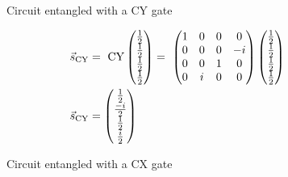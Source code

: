 
\begin{figure}[!h]
    \centering
    \caption{Circuit entangled with a $\mathrm{CY}$ gate}
    \label{fig:cy_entanglement}
\end{figure}


\begin{equation}
    \centering
    \begin{split}
        \vec{s}_{\mathrm{CY}} &=\ \mathrm{CY}\begin{pmatrix}
            \frac{1}{2}\\\frac{1}{2}\\\frac{1}{2}\\\frac{1}{2}
        \end{pmatrix} =\  \begin{pmatrix}
        1 & 0 & 0 & 0 \\
        0 & 0 & 0 & -i \\
        0 & 0 & 1 & 0 \\
        0 & i & 0 & 0
    \end{pmatrix}\begin{pmatrix}
            \frac{1}{2}\\\frac{1}{2}\\\frac{1}{2}\\\frac{1}{2}
        \end{pmatrix} \\
        \vec{s}_{\mathrm{CY}} &= \begin{pmatrix}
            \frac{1}{2}\\\frac{-i}{2}\\\frac{1}{2}\\\frac{i}{2}
        \end{pmatrix}
    \end{split}
    \label{equation:cy_entanglement}
\end{equation}


\begin{figure}[!h]
    \centering
    \caption{Circuit entangled with a $\mathrm{CX}$ gate}
    \label{fig:cx_entanglement}
\end{figure}


